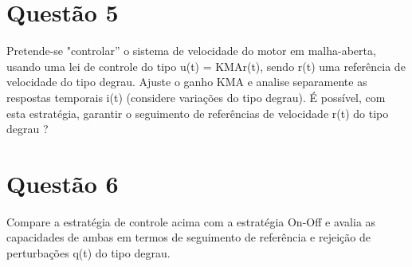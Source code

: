 \documentclass[11pt]{article}
\begin{document}
\section{Questão 5}
Pretende-se "controlar” o sistema de velocidade do motor em malha-aberta, usando uma lei de
controle do tipo u(t) = KMAr(t), sendo r(t) uma referência de velocidade do tipo degrau. Ajuste o
ganho KMA e analise separamente as respostas temporais i(t) (considere variações do tipo degrau). É
possível, com esta estratégia, garantir o seguimento de referências de velocidade r(t) do tipo degrau
?
\section{Questão 6}
Compare a estratégia de controle acima com a estratégia On-Off e avalia as capacidades de ambas
em termos de seguimento de referência e rejeição de perturbações q(t) do tipo degrau.
\end{document}
